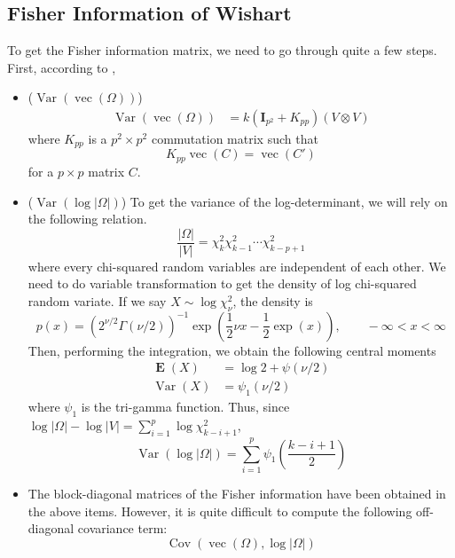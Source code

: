 \documentclass[12pt]{article}
\DeclareMathOperator{\Cov}{Cov}
\DeclareMathOperator{\Var}{Var}
\DeclareMathOperator{\E}{\mathbf{E}}
\DeclareMathOperator{\vvv}{vec}
\begin{document}
\subsection{Fisher Information of Wishart}
To get the Fisher information matrix, we need to go through quite a few steps. First, according to \cite{MultivariateStat}, 
\begin{itemize}
  \item ($\Var(\vvv(\Omega))$)
  \begin{align}
    \Var(\vvv(\Omega)) &= k\left(\mathbf{I}_{p^{2}}+K_{pp}\right)(V\otimes V)
  \end{align}
  where $K_{pp}$ is a $p^{2}\times p^{2}$ commutation matrix such that
  \begin{equation}
    K_{pp}\vvv(C) = \vvv(C')
  \end{equation}
  for a $p\times p$ matrix $C$.
  \item ($\Var(\log|\Omega|)$)
  To get the variance of the log-determinant, we will rely on the following relation.
  \begin{equation}
    \dfrac{|\Omega|}{|V|} = \chi_{k}^{2}\chi_{k-1}^{2}\cdots\chi_{k-p+1}^{2}
  \end{equation}
  where every chi-squared random variables are independent of each other. We need to do variable transformation to get the density of log chi-squared random variate. If we say $X\sim \log\chi_{\nu}^{2}$, the density is
  \begin{equation}
    p(x) = \left(2^{\nu/2}\Gamma(\nu/2)\right)^{-1}\exp\left(\dfrac{1}{2}\nu x-\dfrac{1}{2}\exp(x)\right),\qquad -\infty<x<\infty
  \end{equation}
  Then, performing the integration, we obtain the following central moments
  \begin{align}
    \E(X) &= \log 2+\psi(\nu/2)\\
    \Var(X) &= \psi_{1}(\nu/2)
  \end{align}
  where $\psi_{1}$ is the tri-gamma function. Thus, since $\log|\Omega|-\log|V|=\sum_{i=1}^{p}\log \chi_{k-i+1}^{2}$,
  \begin{equation}
    \Var(\log|\Omega|) = \sum_{i=1}^{p}\psi_{1}\left(\dfrac{k-i+1}{2}\right)
  \end{equation}
  \item The block-diagonal matrices of the Fisher information have been obtained in the above items. However, it is quite difficult to compute the following off-diagonal covariance term:
  \begin{equation}
    \Cov(\vvv(\Omega),\log|\Omega|)
  \end{equation}
\end{itemize}
\end{document}

